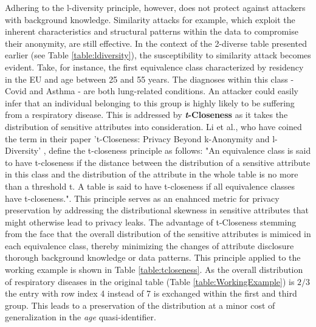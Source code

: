 Adhering to the l-diversity principle, however, does not protect against attackers with background knowledge. Similarity attacks for example, which exploit the inherent characteristics and structural patterns within the data to compromise their anonymity, are still effective. In the context of the 2-diverse table presented earlier (see Table \ref{table:ldiversity}), the susceptibility to similarity attack becomes evident. Take, for instance, the first equivalence class characterized by residency in the EU and age between 25 and 55 years. The diagnoses within this class - Covid and Asthma - are both lung-related conditions. An attacker could easily infer that an individual belonging to this group is highly likely to be suffering from a respiratory disease. This is addressed by \textbf{\textit{t}-Closeness} as it takes the distribution of sensitive attributes into consideration. Li et al., who have coined the term in their paper 't-Closeness: Privacy Beyond k-Anonymity and l-Diversity' \cite{li2007tcloseness}, define the t-closeness principle as follows: "An equivalence class is said to have t-closeness if the distance between the distribution of a sensitive attribute in this class and the distribution of the attribute in the whole table is no more than a threshold t. A table is said to have t-closeness if all equivalence classes have t-closeness.". This principle serves as an enahnced metric for privacy preservation by addressing the distributional skewness in sensitive attributes that might otherwise lead to privacy leaks. The advantage of t-Closeness stemming from the face that the overall distribution of the sensitive attributes is mimiced in each equivalence class, thereby minimizing the changes of attribute disclosure thorough background knowledge or data patterns. This principle applied to the working example is shown in Table \ref{table:tcloseness}. As the overall distribution of respiratory diseases in the original table (Table \ref{table:WorkingExample}) is $2/3$ the entry with row index 4 instead of 7 is exchanged within the first and third group. This leads to a preservation of the distribution at a minor cost of generalization in the \textit{age} quasi-identifier. 

